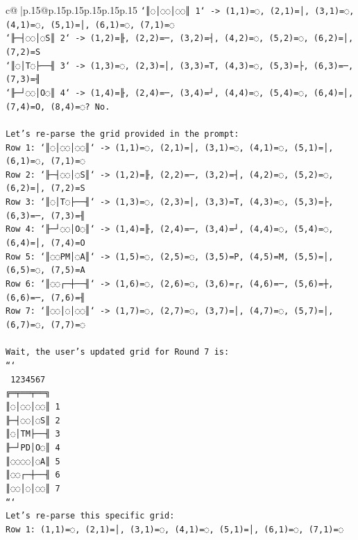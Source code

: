 \documentclass{article}
\begin{document}
{\begin{supertabular}{c@{$\;$}|p{.15\linewidth}@{}p{.15\linewidth}p{.15\linewidth}p{.15\linewidth}p{.15\linewidth}p{.15\linewidth}}
{{{\texttt{`║◌│◌◌│◌◌║ 1` {-}> (1,1)=◌, (2,1)=│, (3,1)=◌, (4,1)=◌, (5,1)=│, (6,1)=◌, (7,1)=◌} \\
\texttt{`╟─┤◌◌│◌S║ 2` {-}> (1,2)=╟, (2,2)=─, (3,2)=┤, (4,2)=◌, (5,2)=◌, (6,2)=│, (7,2)=S} \\
\texttt{`║◌│T◌├──╢ 3` {-}> (1,3)=◌, (2,3)=│, (3,3)=T, (4,3)=◌, (5,3)=├, (6,3)=─, (7,3)=╢} \\
\texttt{`╟─┘◌◌│O◌║ 4` {-}> (1,4)=╟, (2,4)=─, (3,4)=┘, (4,4)=◌, (5,4)=◌, (6,4)=│, (7,4)=O, (8,4)=◌? No.} \\
\\ 
\texttt{Let's re{-}parse the grid provided in the prompt:} \\
\texttt{Row 1: `║◌│◌◌│◌◌║` {-}> (1,1)=◌, (2,1)=│, (3,1)=◌, (4,1)=◌, (5,1)=│, (6,1)=◌, (7,1)=◌} \\
\texttt{Row 2: `╟─┤◌◌│◌S║` {-}> (1,2)=╟, (2,2)=─, (3,2)=┤, (4,2)=◌, (5,2)=◌, (6,2)=│, (7,2)=S} \\
\texttt{Row 3: `║◌│T◌├──╢` {-}> (1,3)=◌, (2,3)=│, (3,3)=T, (4,3)=◌, (5,3)=├, (6,3)=─, (7,3)=╢} \\
\texttt{Row 4: `╟─┘◌◌│O◌║` {-}> (1,4)=╟, (2,4)=─, (3,4)=┘, (4,4)=◌, (5,4)=◌, (6,4)=│, (7,4)=O} \\
\texttt{Row 5: `║◌◌PM│◌A║` {-}> (1,5)=◌, (2,5)=◌, (3,5)=P, (4,5)=M, (5,5)=│, (6,5)=◌, (7,5)=A} \\
\texttt{Row 6: `║◌◌┌─┼──╢` {-}> (1,6)=◌, (2,6)=◌, (3,6)=┌, (4,6)=─, (5,6)=┼, (6,6)=─, (7,6)=╢} \\
\texttt{Row 7: `║◌◌│◌│◌◌║` {-}> (1,7)=◌, (2,7)=◌, (3,7)=│, (4,7)=◌, (5,7)=│, (6,7)=◌, (7,7)=◌} \\
\\ 
\texttt{Wait, the user's updated grid for Round 7 is:} \\
\texttt{```} \\
\texttt{ 1234567} \\
\texttt{╔═╤══╤══╗} \\
\texttt{║◌│◌◌│◌◌║ 1} \\
\texttt{╟─┤◌◌│◌S║ 2} \\
\texttt{║◌│TM├──╢ 3} \\
\texttt{╟─┘PD│O◌║ 4} \\
\texttt{║◌◌◌◌│◌A║ 5} \\
\texttt{║◌◌┌─┼──╢ 6} \\
\texttt{║◌◌│◌│◌◌║ 7} \\
\texttt{```} \\
\texttt{Let's re{-}parse this specific grid:} \\
\texttt{Row 1: (1,1)=◌, (2,1)=│, (3,1)=◌, (4,1)=◌, (5,1)=│, (6,1)=◌, (7,1)=◌} \\
}}}
\end{supertabular}}
\end{document}
